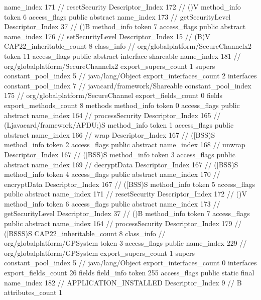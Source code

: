 {{{{{					name_index	171		// resetSecurity
					Descriptor_Index	172		// ()V
				}
				method_info {
					token	6
					access_flags	public abstract
					name_index	173		// getSecurityLevel
					Descriptor_Index	37		// ()B
				}
				method_info {
					token	7
					access_flags	public abstract
					name_index	176		// setSecurityLevel
					Descriptor_Index	15		// (B)V
				}
			}
			CAP22_inheritable_count	8
		}
		class_info {		// org/globalplatform/SecureChannelx2
			token	11
			access_flags	public abstract interface shareable
			name_index	181		// org/globalplatform/SecureChannelx2
			export_supers_count	1
			supers {
				constant_pool_index	5		// java/lang/Object
			}
			export_interfaces_count	2
			interfaces {
				constant_pool_index	7		// javacard/framework/Shareable
				constant_pool_index	175		// org/globalplatform/SecureChannel
			}
			export_fields_count	0
			fields {
			}
			export_methods_count	8
			methods {
				method_info {
					token	0
					access_flags	public abstract
					name_index	164		// processSecurity
					Descriptor_Index	165		// (Ljavacard/framework/APDU;)S
				}
				method_info {
					token	1
					access_flags	public abstract
					name_index	166		// wrap
					Descriptor_Index	167		// ([BSS)S
				}
				method_info {
					token	2
					access_flags	public abstract
					name_index	168		// unwrap
					Descriptor_Index	167		// ([BSS)S
				}
				method_info {
					token	3
					access_flags	public abstract
					name_index	169		// decryptData
					Descriptor_Index	167		// ([BSS)S
				}
				method_info {
					token	4
					access_flags	public abstract
					name_index	170		// encryptData
					Descriptor_Index	167		// ([BSS)S
				}
				method_info {
					token	5
					access_flags	public abstract
					name_index	171		// resetSecurity
					Descriptor_Index	172		// ()V
				}
				method_info {
					token	6
					access_flags	public abstract
					name_index	173		// getSecurityLevel
					Descriptor_Index	37		// ()B
				}
				method_info {
					token	7
					access_flags	public abstract
					name_index	164		// processSecurity
					Descriptor_Index	179		// ([BSSS)S
				}
			}
			CAP22_inheritable_count	8
		}
		class_info {		// org/globalplatform/GPSystem
			token	3
			access_flags	public
			name_index	229		// org/globalplatform/GPSystem
			export_supers_count	1
			supers {
				constant_pool_index	5		// java/lang/Object
			}
			export_interfaces_count	0
			interfaces {
			}
			export_fields_count	26
			fields {
			field_info {
				token	255
				access_flags	public static final
				name_index	182		// APPLICATION_INSTALLED
				Descriptor_Index	9		// B
				attributes_count	1
}}}}}
